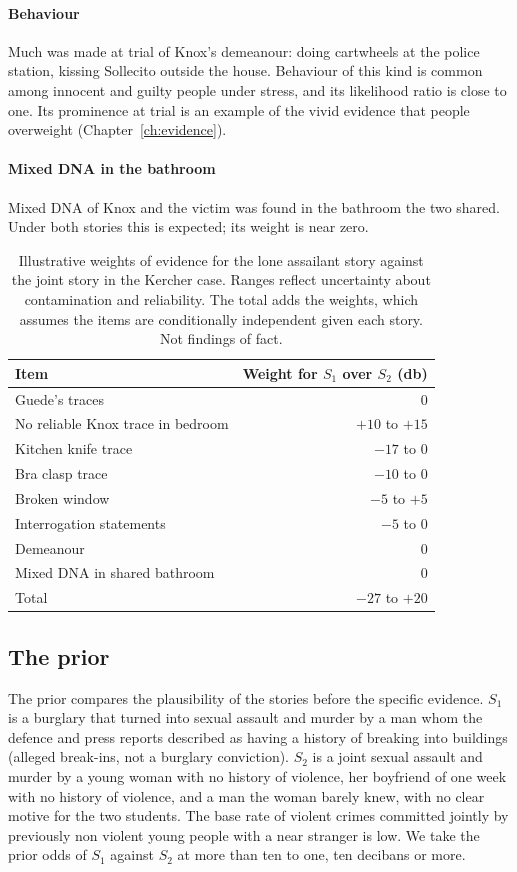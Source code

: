 \paragraph{Behaviour} Much was made at trial of Knox's demeanour: doing cartwheels at the police station, kissing Sollecito outside the house. Behaviour of this kind is common among innocent and guilty people under stress, and its likelihood ratio is close to one. Its prominence at trial is an example of the vivid evidence that people overweight (Chapter~\ref{ch:evidence}).

\paragraph{Mixed DNA in the bathroom} Mixed DNA of Knox and the victim was found in the bathroom the two shared. Under both stories this is expected; its weight is near zero.

\begin{table}[t]
\centering\small
\begin{tabular}{p{4.6cm}r}
\toprule
Item & Weight for $S_1$ over $S_2$ (db)\\
\midrule
Guede's traces & $0$\\
No reliable Knox trace in bedroom & $+10$ to $+15$\\
Kitchen knife trace & $-17$ to $0$\\
Bra clasp trace & $-10$ to $0$\\
Broken window & $-5$ to $+5$\\
Interrogation statements & $-5$ to $0$\\
Demeanour & $0$\\
Mixed DNA in shared bathroom & $0$\\
\midrule
Total & $-27$ to $+20$\\
\bottomrule
\end{tabular}
\caption{Illustrative weights of evidence for the lone assailant story against the joint story in the Kercher case. Ranges reflect uncertainty about contamination and reliability. The total adds the weights, which assumes the items are conditionally independent given each story. Not findings of fact.}
\label{tab:kercher}
\end{table}

\subsection{The prior}

The prior compares the plausibility of the stories before the specific evidence. $S_1$ is a burglary that turned into sexual assault and murder by a man whom the defence and press reports described as having a history of breaking into buildings (alleged break-ins, not a burglary conviction). $S_2$ is a joint sexual assault and murder by a young woman with no history of violence, her boyfriend of one week with no history of violence, and a man the woman barely knew, with no clear motive for the two students. The base rate of violent crimes committed jointly by previously non violent young people with a near stranger is low. We take the prior odds of $S_1$ against $S_2$ at more than ten to one, ten decibans or more.

